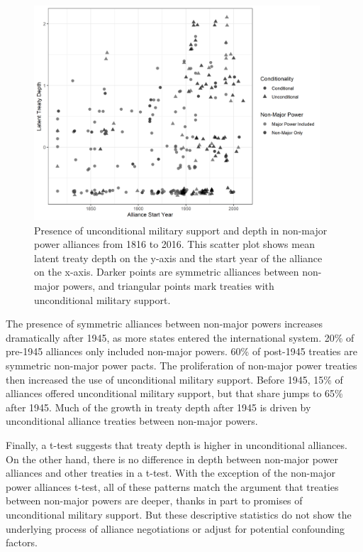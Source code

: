 \documentclass[12pt]{article}
\begin{document}
\begin{figure}[hbtp]
\centering
\includegraphics[width=0.95\textwidth]{../figures/non-maj-combo.png}
\caption{Presence of unconditional military support and depth in non-major power alliances from 1816 to 2016. This scatter plot shows mean latent treaty depth on the y-axis and the start year of the alliance on the x-axis. Darker points are symmetric alliances between non-major powers, and triangular points mark treaties with unconditional military support.}
\label{fig:non-maj-combo}
\end{figure}


The presence of symmetric alliances between non-major powers increases dramatically after 1945, as more states entered the international system. 
20\% of pre-1945 alliances only included non-major powers. 
60\% of post-1945 treaties are symmetric non-major power pacts. 
The proliferation of non-major power treaties then increased the use of unconditional military support. 
Before 1945, 15\% of alliances offered unconditional military support, but that share jumps to 65\% after 1945. 
Much of the growth in treaty depth after 1945 is driven by unconditional alliance treaties between non-major powers. 


Finally, a t-test suggests that treaty depth is higher in unconditional alliances. 
On the other hand, there is no difference in depth between non-major power alliances and other treaties in a t-test. 
With the exception of the non-major power alliances t-test, all of these patterns match the argument that treaties between non-major powers are deeper, thanks in part to promises of unconditional military support. 
But these descriptive statistics do not show the underlying process of alliance negotiations or adjust for potential confounding factors. 
\end{document}
